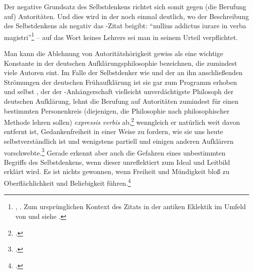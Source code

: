 Der negative Grundsatz des Selbstdenkens richtet sich somit gegen (die Berufung
auf) Autoritäten. Und dies wird in der  noch einmal
deutlich, wo  der Beschreibung des Selbstdenkens als
negativ das -Zitat beigibt:
\enquote{nullius addictus iurare in verba
magistri}\footnote{\cite[][BA~167]{Kant:AnthropologieinpragmatischerHinsicht1977},
\cite[][VII: 228.35]{Kant:GesammelteWerke1900ff.}. Zum ursprünglichen Kontext
des Zitats in der antiken Eklektik im Umfeld von  und
 siehe \cite[][38--49]{Albrecht:Eklektik1994}.} -- auf das
Wort keines Lehrers sei man in seinem Urteil verpflichtet.

\label{Abschnitt:AufklaerungundMuendigkeitdurchKompetenz}
Man kann die Ablehnung von Autoritätshörigkeit gewiss als eine wichtige
Konstante in der deutschen Aufklärungsphilosophie bezeichnen, die zumindest viele Autoren
eint. Im Falle der Selbstdenker wie  und der an ihn
anschließenden Strömungen der deutschen Frühaufklärung ist sie gar zum Programm erhoben und selbst
, der der -Anhängerschaft vielleicht unverdächtigste
Philosoph der deutschen Aufklärung, lehnt die Berufung auf Autoritäten zumindest
für einen bestimmten Personenkreis (diejenigen, die Philosophie nach
philosophischer Methode lehren sollen) \emph{expressis verbis}
ab,\footcite[Vgl.][\S~156]{Wolff:Discursuspraeliminarisdephilosophiaingenere1996} wenngleich er natürlich weit davon entfernt ist, Gedankenfreiheit in einer Weise zu fordern, wie sie uns heute selbstverständlich ist und wenigstens
partiell  und einigen anderen Aufklärern
vorschwebte.\footnote{\cite[Vgl.][S.~xliv]{Gawlick:Einleitung1996}.}
Gerade  erkennt aber auch die Gefahren eines unbestimmten Begriffs
des Selbstdenkens, wenn dieser unreflektiert zum Ideal und Leitbild erklärt
wird. Es ist nichts gewonnen, wenn Freiheit und Mündigkeit bloß zu
Oberflächlichkeit und Beliebigkeit
führen.\footcite[Vgl.][Dedicatio,
\pno~259]{Wolff:Discursuspraeliminarisdephilosophiaingenere1996}


